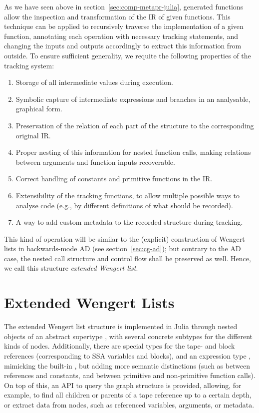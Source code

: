As we have seen above in section~\ref{sec:comp-metapr-julia}, generated functions allow the
inspection and transformation of the IR of given functions.  This technique can be applied to
recursively traverse the implementation of a given function, annotating each operation with
necessary tracking statements, and changing the inputs and outputs accordingly to extract this
information from outside.  To ensure sufficient generality, we requite the following properties of
the tracking system:
\begin{enumerate}
  \firmlist
\item Storage of all intermediate values during execution.
\item Symbolic capture of intermediate expressions and branches in an analysable, graphical form.
\item Preservation of the relation of each part of the structure to the corresponding original IR.
\item Proper nesting of this information for nested function calls, making relations between
  arguments and function inputs recoverable.
\item Correct handling of constants and primitive functions in the IR.
\item Extensibility of the tracking functions, to allow multiple possible ways to analyse code
  (e.g., by different definitions of what should be recorded).
\item A way to add custom metadata to the recorded structure during tracking.
\end{enumerate}
This kind of operation will be similar to the (explicit) construction of Wengert lists in
backwards-mode AD (see section~\ref{sec:cg-ad}); but contrary to the AD case, the nested call
structure and control flow shall be preserved as well.  Hence, we call this structure \emph{extended
  Wengert list}.

\section{Extended Wengert Lists}
\label{sec:exteded-wengert-lists}

The extended Wengert list structure is implemented in Julia through nested objects of an abstract
supertype , with several concrete subtypes for the different kinds of nodes.
Additionally, there are special types for the tape- and block references (corresponding to SSA
variables and blocks), and an expression type , mimicking the built-in
, but adding more semantic distinctions (such as between references and constants, and
between primitive and non-primitive function calls).  On top of this, an API to query the graph
structure is provided, allowing, for example, to find all children or parents of a tape reference up
to a certain depth, or extract data from nodes, such as referenced variables, arguments, or
metadata.

